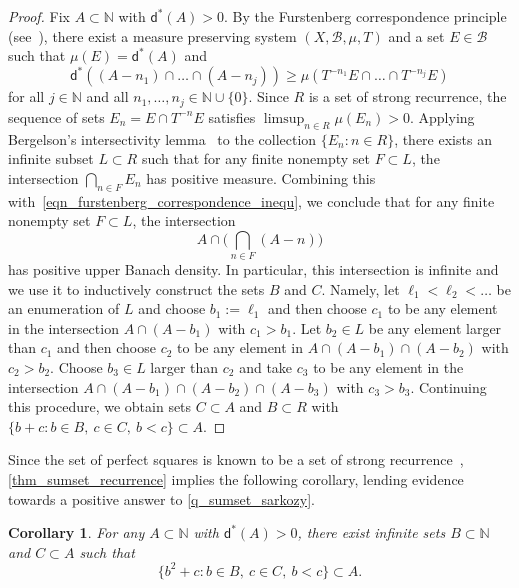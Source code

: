 \documentclass[10pt,dvipsnames]{article}
\newtheorem{corollary}[theorem]{Corollary}
\theoremstyle{definition}
\theoremstyle{plain}
\newcommand{\N}{\mathbb{N}}
\newcommand{\ubdens}{\mathsf{d}^*}
\begin{document}
\begin{proof}
Fix $A\subset\N$ with $\ubdens(A)>0$.
By the Furstenberg correspondence principle (see~\cite{Furstenberg-book}), there exist a measure preserving system $(X,\mathcal{B},\mu,T)$ and a set $E\in\mathcal{B}$ such that $\mu(E)=\ubdens(A)$ and 
\begin{equation}
\label{eqn_furstenberg_correspondence_inequ}    
\ubdens((A-n_1)\cap\ldots\cap (A-n_j))\geq \mu(T^{-n_1}E\cap\ldots\cap T^{-n_j}E)
\end{equation}
for all $j\in\N$ and all $n_1,\ldots,n_j\in\N\cup\{0\}$.
Since $R$ is a set of strong recurrence, the sequence of sets $E_n=E\cap T^{-n}E$ satisfies $\limsup_{n\in R}\mu(E_n)>0$. 
Applying Bergelson's intersectivity lemma~\cite[Corollary~2.4]{bergelson} to the collection $\{E_n:n\in R\}$, there exists an infinite subset $L\subset R$ such that for any finite nonempty set $F\subset L$, the intersection $\bigcap_{n\in F} E_n$ has positive measure.  
Combining this with~\eqref{eqn_furstenberg_correspondence_inequ},  we conclude that for any finite nonempty set $F\subset L$, the intersection
\[
A\cap\biggl(\bigcap_{n\in F} (A-n)\biggr)
\]
has positive upper Banach density. 
In particular, this intersection is infinite and we use it to inductively construct the sets $B$ and $C$.  Namely, let $\ell_1<\ell_2<\ldots$ be an enumeration of $L$ and choose $b_1:=\ell_1$ and then choose $c_1$ to be any element in the intersection $A\cap (A-b_1)$ with $c_1>b_1$. 
Let $b_2\in L$ be any element larger than $c_1$ and then choose $c_2$ to be any element in $A\cap (A-b_1)\cap (A-b_2)$ with $c_2>b_2$. 
Choose $b_3\in L$ larger than $c_2$ and take $c_3$ to be any element in the intersection $A\cap (A-b_1)\cap (A-b_2) \cap (A-b_3)$ with $c_3>b_3$. 
Continuing this procedure, we obtain sets $C\subset A$ and $B\subset R$ with $\{b+c: b\in B,~c\in C,~b<c\}\subset A$.
\end{proof}

Since the set of perfect squares is known to be a set of strong recurrence~\cite{Furstenberg-1977}, \cref{thm_sumset_recurrence} implies the following corollary, lending evidence towards a positive answer to \cref{q_sumset_sarkozy}.

\begin{corollary}
For any $A\subset\N$ with $\ubdens(A)>0$, there exist infinite sets $B\subset \N$ and $C\subset A$ such that
\[
\{b^2+c: b\in B,~c\in C,~b<c\}\subset A.
\]
\end{corollary}
\end{document}
